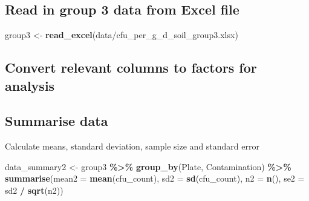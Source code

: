 \documentclass[
]{article}
\newenvironment{Shaded}{\begin{snugshade}}{\end{snugshade}}
\newcommand{\AttributeTok}[1]{\textcolor[rgb]{0.13,0.29,0.53}{#1}}
\newcommand{\CommentTok}[1]{\textcolor[rgb]{0.56,0.35,0.01}{\textit{#1}}}
\newcommand{\FunctionTok}[1]{\textcolor[rgb]{0.13,0.29,0.53}{\textbf{#1}}}
\newcommand{\NormalTok}[1]{#1}
\newcommand{\OtherTok}[1]{\textcolor[rgb]{0.56,0.35,0.01}{#1}}
\newcommand{\SpecialCharTok}[1]{\textcolor[rgb]{0.81,0.36,0.00}{\textbf{#1}}}
\newcommand{\StringTok}[1]{\textcolor[rgb]{0.31,0.60,0.02}{#1}}
\begin{document}
\subsection{Read in group 3 data from Excel
file}\label{read-in-group-3-data-from-excel-file}

\begin{Shaded}
\begin{Highlighting}[]
\NormalTok{group3 }\OtherTok{\textless{}{-}} \FunctionTok{read\_excel}\NormalTok{(}\StringTok{\textquotesingle{}data/cfu\_per\_g\_d\_soil\_group3.xlsx\textquotesingle{}}\NormalTok{)}
\end{Highlighting}
\end{Shaded}

\subsection{Convert relevant columns to factors for
analysis}\label{convert-relevant-columns-to-factors-for-analysis}

\begin{Shaded}
\end{Shaded}

\subsection{Summarise data}\label{summarise-data-1}

Calculate means, standard deviation, sample size and standard error

\begin{Shaded}
\begin{Highlighting}[]
\NormalTok{data\_summary2 }\OtherTok{\textless{}{-}}\NormalTok{ group3 }\SpecialCharTok{\%\textgreater{}\%}
  \FunctionTok{group\_by}\NormalTok{(Plate, Contamination) }\SpecialCharTok{\%\textgreater{}\%}
  \FunctionTok{summarise}\NormalTok{(}\AttributeTok{mean2 =} \FunctionTok{mean}\NormalTok{(cfu\_count),}
            \AttributeTok{sd2 =} \FunctionTok{sd}\NormalTok{(cfu\_count),}
            \AttributeTok{n2 =} \FunctionTok{n}\NormalTok{(),}
            \AttributeTok{se2 =}\NormalTok{ sd2 }\SpecialCharTok{/} \FunctionTok{sqrt}\NormalTok{(n2))}
\end{Highlighting}
\end{Shaded}
\end{document}

